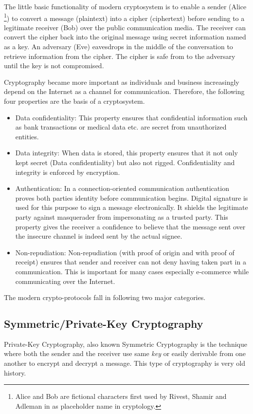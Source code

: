 The little basic functionality of modern cryptosystem is to enable a sender (Alice \footnote{Alice and Bob are fictional characters first used by Rivest, Shamir and Adleman in \cite{rivest1978method} as placeholder name in cryptology.}) to convert a message (plaintext) into a cipher (ciphertext) before sending to a legitimate receiver (Bob) over the public communication media. 
The receiver can convert the cipher back into the original message using secret information named as a key.
An adversary (Eve) eavesdrops in the middle of the conversation to retrieve information from the cipher.
The cipher is safe from to the adversary until the key is not compromised. 

Cryptography became more important as individuals and business increasingly depend on the Internet as a channel for communication. Therefore, the following four properties are the basis of a cryptosystem.


\begin{itemize}
\item Data confidentiality:
This property ensures that confidential information such as bank transactions or medical data etc. are secret from unauthorized entities. 

\item Data integrity:
When data is stored, this property ensures that it not only kept secret (Data confidentiality) but also not rigged.
Confidentiality and integrity is enforced by encryption.

\item Authentication:
In a connection-oriented communication authentication proves both parties identity before communication begins.
Digital signature is used for this purpose to sign a message electronically.
It shields the legitimate party against masquerader from impersonating as a trusted party.
This property gives the receiver a confidence to believe that the message sent over the insecure channel is indeed sent by the actual signee.

\item Non-repudiation:
Non-repudiation (with proof of origin and with proof of receipt) ensures that sender and receiver can not deny having taken part in a communication.
This is important for many cases especially e-commerce while communicating over the Internet.
\end{itemize}

The modern crypto-protocols fall in following two major categories. 

\subsection{Symmetric/Private-Key Cryptography}
Private-Key Cryptography, also known Symmetric Cryptography is the technique where both the sender and the receiver use same \textit{key} or easily derivable from one another to encrypt and decrypt a message.
This type of cryptography is very old history. 

